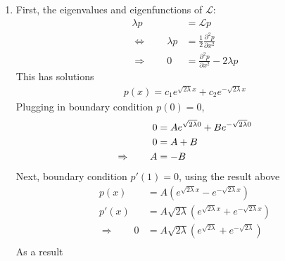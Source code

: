 \documentclass[12pt]{article}
\theoremstyle{plain}
\theoremstyle{definition}
\theoremstyle{remark}
\begin{document}
\begin{enumerate}
    \begin{enumerate}
      \item %
        First, the eigenvalues and eigenfunctions of $\mathscr{L}$:
        \begin{align*}
          \lambda p &= \mathscr{L} p\\
          \Leftrightarrow \qquad
          \lambda p &= \frac{1}{2} \frac{\partial^2 p}{\partial x^2}\\
          \Rightarrow \qquad
          0 &= \frac{\partial^2 p}{\partial x^2} -2\lambda p
        \end{align*}
        This has solutions
        \begin{align*}
          p(x) = c_1 e^{\sqrt{2\lambda} x} + c_2 e^{-\sqrt{2\lambda} x}
        \end{align*}
        Plugging in boundary condition $p(0)=0$,
        \begin{align}
          0 &= A e^{\sqrt{2\lambda} 0} + B e^{-\sqrt{2\lambda} 0} \notag\\
          0 &= A + B \notag \\
          \Rightarrow \qquad
          A &= -B \label{q3a.1}
        \end{align}
        Next, boundary condition $p'(1) = 0$, using the result above
        \begin{align*}
          p(x) &= A (e^{\sqrt{2\lambda} x} - e^{-\sqrt{2\lambda} x}) \\
          p'(x) &= A \sqrt{2\lambda} (e^{\sqrt{2\lambda} x} +  e^{-\sqrt{2\lambda} x}) \\
          \Rightarrow\qquad
          0 &=
          A \sqrt{2\lambda} (e^{\sqrt{2\lambda}} +  e^{-\sqrt{2\lambda}}) \\
        \end{align*}
        As a result
        \begin{align*}
        \end{align*}
    \end{enumerate}


\end{enumerate}
\end{document}
